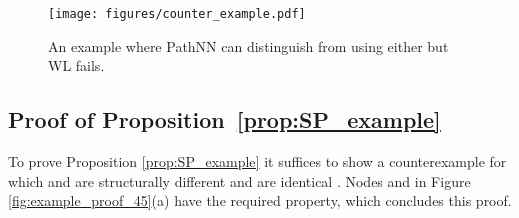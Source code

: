 \documentclass{article}
\theoremstyle{plain}
\theoremstyle{definition}
\theoremstyle{remark}
\begin{document}
\begin{figure}
    \centering
    \texttt{[image: figures/counter\_example.pdf]}
    \caption{An example where PathNN can distinguish  from  using either  but WL fails.}
    \label{fig:WL_fails}
\end{figure}

\subsection{Proof of Proposition~\ref{prop:SP_example}}




To prove Proposition \ref{prop:SP_example} it suffices to show a counterexample for which  and  are structurally different and  are identical . Nodes  and  in Figure \ref{fig:example_proof_45}(a) have the required property, which concludes this proof. 

\begin{figure*}[t]
  \centering
  \hfill
  \hfill
  \caption{WL-Trees can distinguish node  and , while -Trees and -Trees fail to do so, since they do not include the `problematic edge' highlighted in \textcolor{red}{red}. However, -Trees or -Trees rooted at any node different than  in the triangle graph will take the `problematic edge'  into account and hence guarantee disambiguation at the graph level. }
  \label{fig:example_proof_45}
\end{figure*}
\end{document}
